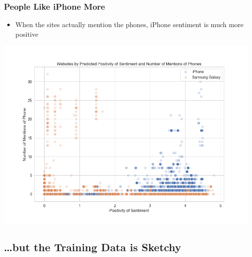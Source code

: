 \documentclass[10pt]{beamer}
\begin{document}
\begin{frame}
\frametitle{People Like iPhone More}

\begin{itemize}
    \item When the sites actually mention the phones, iPhone sentiment is much more positive
\end{itemize}

{
    \centering
    \includegraphics[width=\textwidth,height=\textheight,keepaspectratio]{sentiment_comparison_predictions.png}
    \par
}

\end{frame}

\subsection{\ldots but the Training Data is Sketchy}
\end{document}
